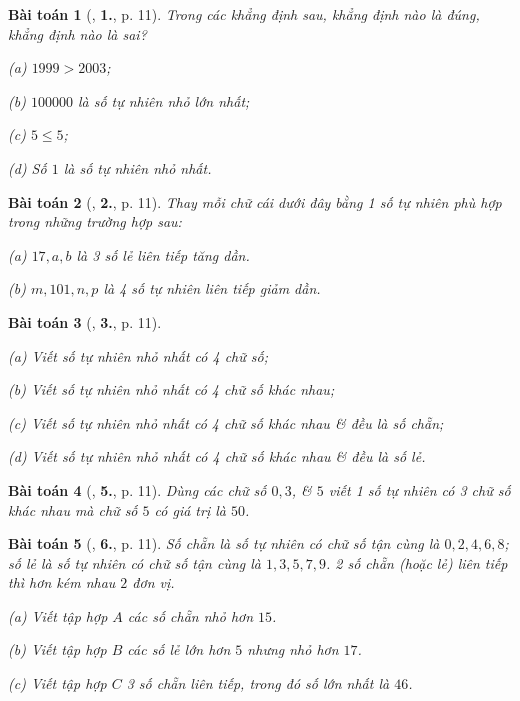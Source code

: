 \documentclass{article}
\numberwithin{equation}{section}
\newtheorem{baitoan}{Bài toán}[section]
\begin{document}
\begin{baitoan}[\cite{Trong_Toan_6_2021}, \textbf{1.}, p. 11]
	Trong các khẳng định sau, khẳng định nào là đúng, khẳng định nào là sai?
	\begin{enumerate*}
		\item[(a)] $1999 > 2003$;
		\item[(b)] $100000$ là số tự nhiên nhỏ lớn nhất;
		\item[(c)] $5\le 5$;
		\item[(d)] Số $1$ là số tự nhiên nhỏ nhất.
	\end{enumerate*}
\end{baitoan}

\begin{baitoan}[\cite{Trong_Toan_6_2021}, \textbf{2.}, p. 11]
	Thay mỗi chữ cái dưới đây bằng 1 số tự nhiên phù hợp trong những trường hợp sau:
	\begin{enumerate*}
		\item[(a)] $17,a,b$ là 3 số lẻ liên tiếp tăng dần.
		\item[(b)] $m,101,n,p$ là 4 số tự nhiên liên tiếp giảm dần.
	\end{enumerate*}
\end{baitoan}

\begin{baitoan}[\cite{Trong_Toan_6_2021}, \textbf{3.}, p. 11]
	\begin{enumerate*}
		\item[(a)] Viết số tự nhiên nhỏ nhất có 4 chữ số;
		\item[(b)] Viết số tự nhiên nhỏ nhất có 4 chữ số khác nhau;
		\item[(c)] Viết số tự nhiên nhỏ nhất có 4 chữ số khác nhau \& đều là số chẵn;
		\item[(d)] Viết số tự nhiên nhỏ nhất có 4 chữ số khác nhau \& đều là số lẻ.
	\end{enumerate*}
\end{baitoan}

\begin{baitoan}[\cite{Trong_Toan_6_2021}, \textbf{5.}, p. 11]
	Dùng các chữ số $0,3$, \& $5$ viết 1 số tự nhiên có 3 chữ số khác nhau mà chữ số $5$ có giá trị là $50$.
\end{baitoan}

\begin{baitoan}[\cite{Trong_Toan_6_2021}, \textbf{6.}, p. 11]
	\emph{Số chẵn} là số tự nhiên có chữ số tận cùng là $0,2,4,6,8$; \emph{số lẻ} là số tự nhiên có chữ số tận cùng là $1,3,5,7,9$. 2 số chẵn (hoặc lẻ) \emph{liên tiếp} thì hơn kém nhau $2$ đơn vị.
	\begin{enumerate*}
		\item[(a)] Viết tập hợp $A$ các số chẵn nhỏ hơn $15$.
		\item[(b)] Viết tập hợp $B$ các số lẻ lớn hơn $5$ nhưng nhỏ hơn $17$.
		\item[(c)] Viết tập hợp $C$ 3 số chẵn liên tiếp, trong đó số lớn nhất là $46$.
	\end{enumerate*}
\end{baitoan}
\end{document}
